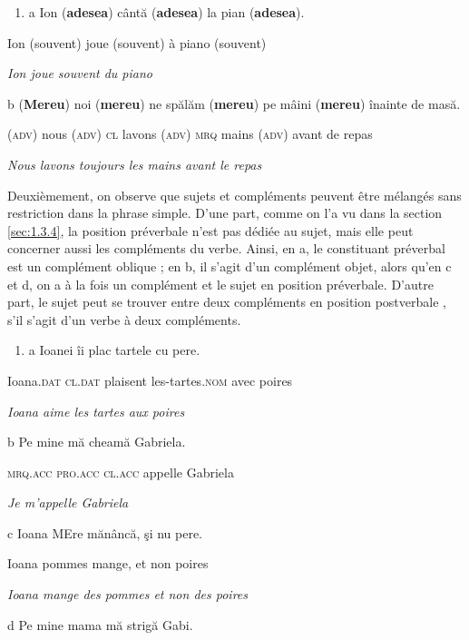 \begin{enumerate}
\item a  Ion (\textbf{adesea}) cântă (\textbf{adesea}) la pian (\textbf{adesea}).


\end{enumerate}
  Ion (souvent) joue (souvent) à piano (souvent) 

\textit{Ion joue souvent du piano}  

  b  (\textbf{Mereu})\textbf{ } noi  (\textbf{mereu})  ne spălăm  (\textbf{mereu}) pe mâini (\textbf{mereu}) înainte de masă.

    (\textsc{adv})  nous  (\textsc{adv})  \textsc{cl} lavons  (\textsc{adv}) \textsc{mrq}  mains (\textsc{adv}) avant de repas 

  \textit{Nous lavons toujours les mains avant le repas}

Deuxièmement, on observe que sujets et compléments peuvent être mélangés sans restriction dans la phrase simple. D'une part, comme on l'a vu dans la section \ref{sec:1.3.4}, la position préverbale n'est pas dédiée au sujet, mais elle peut concerner aussi les compléments du verbe. Ainsi, en a, le constituant préverbal est un complément oblique ; en b, il s'agit d'un complément objet, alors qu'en c et d, on a à la fois un complément et le sujet en position préverbale. D'autre part, le sujet peut se trouver entre deux compléments en position postverbale , s'il s'agit d'un verbe à deux compléments.  


\begin{enumerate}
\item \label{bkm:Ref299315318}a  Ioanei  îi  plac  tartele  cu  pere.


\end{enumerate}
  Ioana\textsc{.dat  cl.dat}  plaisent  les-tartes.\textsc{nom}  avec  poires 

\textit{Ioana aime les tartes aux poires}  

  b  Pe  mine  mă  cheamă  Gabriela.

    \textsc{mrq.acc  pro.acc  cl.acc}  appelle  Gabriela 

    \textit{Je m'appelle Gabriela}

  c  Ioana  MEre  mănâncă,  şi  nu  pere.

    Ioana  pommes  mange,  et  non  poires 

    \textit{Ioana mange des pommes et non des poires}

  d  Pe  mine  mama  mă  strigă  Gabi.


